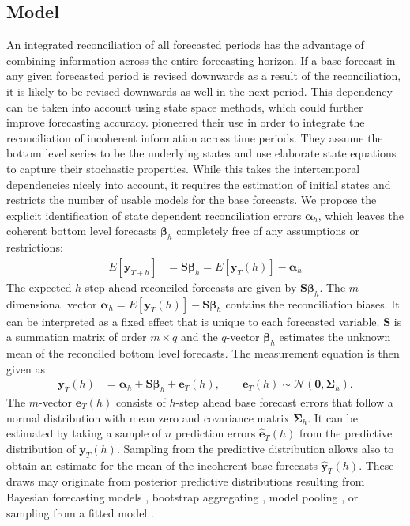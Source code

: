 \documentclass[a4paper,fleqn,11pt]{article}
\begin{document}
\subsection{Model}
An integrated reconciliation of all forecasted periods has the advantage of combining information across the entire forecasting horizon. If a base forecast in any given forecasted period is revised downwards as a result of the reconciliation, it is likely to be revised downwards as well in the next period. This dependency can be taken into account using state space methods, which could further improve forecasting accuracy. \cite{Pennings2017} pioneered their use in order to integrate the reconciliation of incoherent information across time periods. They assume the bottom level series to be the underlying states and use elaborate state equations to capture their stochastic properties. While this takes the intertemporal dependencies nicely into account, it requires the estimation of initial states and restricts the number of usable models for the base forecasts. We propose the explicit identification of state dependent reconciliation errors $\boldsymbol{\alpha}_h$, which leaves the coherent bottom level forecasts $\boldsymbol{\beta}_h$ completely free of any assumptions or restrictions:
\begin{align}
	\label{eq:main}
	E\left[\textbf{y}_{T+h}\right] & = \textbf{S} \boldsymbol{\beta}_h = E\left[\mathbf{y}_{T}(h)\right] - \boldsymbol{\alpha}_h
\end{align}
The expected $h$-step-ahead reconciled forecasts are given by $\textbf{S} \boldsymbol{\beta}_h$.  The $m$-dimensional vector $\boldsymbol{\alpha}_h = E\left[\mathbf{y}_{T}(h)\right] - \textbf{S} \boldsymbol{\beta}_h$ contains the reconciliation biases. It can be interpreted as a fixed effect that is unique to each forecasted variable. $\textbf{S}$ is a summation matrix of order $m \times q$ and the $q$-vector $\boldsymbol{\beta}_h$ estimates the unknown mean of the reconciled bottom level forecasts. The measurement equation is then given as
\begin{align}
\label{eq:meas1}
\mathbf{y}_{T}(h) &  = \boldsymbol{\alpha}_h + \textbf{S} \boldsymbol{\beta}_h + \mathbf{e}_{T}(h), \qquad \mathbf{e}_{T}(h) \sim \mathcal{N}(\textbf{0}, \boldsymbol{\Sigma}_h).
\end{align}
The $m$-vector $\mathbf{e}_{T}(h)$ consists of $h$-step ahead base forecast errors that follow a normal distribution with mean zero and covariance matrix $\boldsymbol{\Sigma}_h$. It can be estimated by taking a sample of $n$ prediction errors $\mathbf{\hat{e}}_{T}(h)$ from the predictive distribution of $\mathbf{y}_{T}(h) $. Sampling from the predictive distribution allows also to obtain an estimate for the mean of the incoherent base forecasts $\mathbf{\hat{y}}_{T}(h)$.  These draws may originate from posterior predictive distributions resulting from Bayesian forecasting models \citep{Cesur2016}, bootstrap aggregating \citep{Bergmeir2016}, model pooling \citep{Timmermann2006,Kapetanios2015}, or sampling from a fitted model \citep{Hyndman2018}. 
\end{document}
